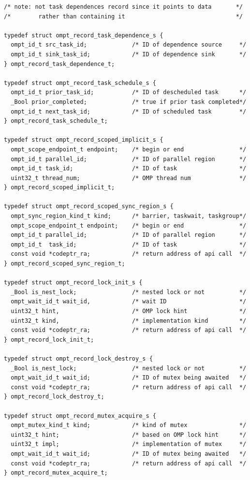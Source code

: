 \documentclass{article}
\begin{document}
\begin{verbatim}
/* note: not task dependences record since it points to data       */
/*        rather than containing it                                */

typedef struct ompt_record_task_dependence_s {
  ompt_id_t src_task_id;             /* ID of dependence source     */
  ompt_id_t sink_task_id;            /* ID of dependence sink       */
} ompt_record_task_dependence_t;

typedef struct ompt_record_task_schedule_s {
  ompt_id_t prior_task_id;           /* ID of descheduled task      */
  _Bool prior_completed;             /* true if prior task completed*/
  ompt_id_t next_task_id;            /* ID of scheduled task        */
} ompt_record_task_schedule_t;

typedef struct ompt_record_scoped_implicit_s {
  ompt_scope_endpoint_t endpoint;    /* begin or end                */
  ompt_id_t parallel_id;             /* ID of parallel region       */
  ompt_id_t task_id;                 /* ID of task                  */
  uint32_t thread_num;               /* OMP thread num              */
} ompt_record_scoped_implicit_t;

typedef struct ompt_record_scoped_sync_region_s {
  ompt_sync_region_kind_t kind;      /* barrier, taskwait, taskgroup*/
  ompt_scope_endpoint_t endpoint;    /* begin or end                */ 
  ompt_id_t parallel_id;             /* ID of parallel region       */
  ompt_id_t  task_id;                /* ID of task                  */
  const void *codeptr_ra;            /* return address of api call  */
} ompt_record_scoped_sync_region_t;

typedef struct ompt_record_lock_init_s {
  _Bool is_nest_lock;                /* nested lock or not          */
  ompt_wait_id_t wait_id,            /* wait ID                     */
  uint32_t hint,                     /* OMP lock hint               */
  uint32_t kind,                     /* implementation kind         */
  const void *codeptr_ra;            /* return address of api call  */          
} ompt_record_lock_init_t;

typedef struct ompt_record_lock_destroy_s {
  _Bool is_nest_lock;                /* nested lock or not          */
  ompt_wait_id_t wait_id;            /* ID of mutex being awaited   */
  const void *codeptr_ra;            /* return address of api call  */       
} ompt_record_lock_destroy_t;

typedef struct ompt_record_mutex_acquire_s {
  ompt_mutex_kind_t kind;            /* kind of mutex               */
  uint32_t hint;                     /* based on OMP lock hint      */
  uint32_t impl;                     /* implementation of mutex     */
  ompt_wait_id_t wait_id;            /* ID of mutex being awaited   */
  const void *codeptr_ra;            /* return address of api call  */          
} ompt_record_mutex_acquire_t;


\end{verbatim}
\end{document}
